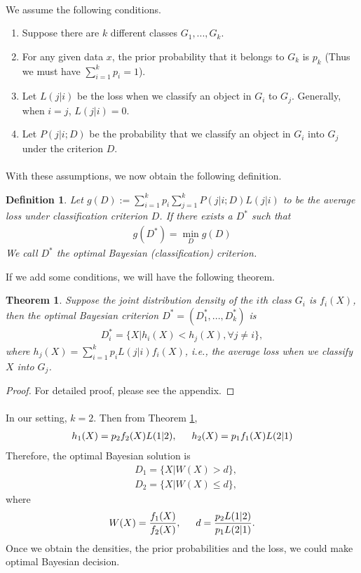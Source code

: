 \documentclass[english]{article}
\newenvironment{eqt}{\begin{equation}\begin{aligned}}{\end{aligned}\end{equation}}
\newtheorem{defn}{Definition}[section]
\newtheorem{thm}{Theorem}[section]
\begin{document}
\paragraph{}
We assume the following conditions.
\begin{enumerate}
\item Suppose there are $k$ different classes $G_1, ..., G_k$. 
\item For any given data $x$, the prior probability that it belongs to $G_k$ is $p_k$ (Thus we must have $\sum_{i=1}^kp_i=1$). 
\item Let $L(j|i)$ be the loss when we classify an object in $G_i$ to $G_j$. Generally, when $i=j$, $L(j|i) = 0$.
\item Let $P(j|i;D)$ be the probability that we classify an object in $G_i$ into $G_j$ under the criterion $D$.
\end{enumerate}
\paragraph{}
With these assumptions, we now obtain the following definition.

\begin{defn}
Let $g(D) := \sum_{i=1}^kp_i\sum_{j=1}^kP(j|i;D)L(j|i)$ to be the average loss under classification criterion $D$. If there exists a $D^*$ such that
\begin{eqt}
g(D^*) = \min_Dg(D)
\end{eqt}
We call $D^*$ the optimal Bayesian (classification) criterion.
\end{defn}
If we add some conditions, we will have the following theorem.
\begin{thm}
\label{optbayes}
Suppose the joint distribution density of the $i$th class $G_i$ is $f_i(X)$, then the optimal Bayesian criterion $D^*=(D_1^*, ..., D_k^*)$ is
\begin{eqt}
\label{optbayescrit}
D_i^* = \{X|h_i(X)<h_j(X), \forall j\neq i\},
\end{eqt}
where $h_j(X) = \sum_{i=1}^kp_iL(j|i)f_i(X)$, i.e., the average loss when we classify $X$ into $G_j$.
\end{thm}
\begin{proof}
For detailed proof, please see the appendix.
\end{proof}
\paragraph{}
In our setting, $k=2$. Then from Theorem \ref{optbayes},
\begin{eqt}
h_1(X) = p_2f_2(X)L(1|2),\indent h_2(X) = p_1f_1(X)L(2|1)
\end{eqt}
Therefore, the optimal Bayesian solution is 
\begin{eqt}
&D_1 = \{X|W(X)>d\}, \\
&D_2 = \{X|W(X)\leqslant d\},
\end{eqt}
where
\begin{eqt}
\label{param}
W(X) = \frac{f_1(X)}{f_2(X)},\indent d = \frac{p_2L(1|2)}{p_1L(2|1)}.
\end{eqt}
Once we obtain the densities, the prior probabilities and the loss, we could make optimal Bayesian decision.
\end{document}
